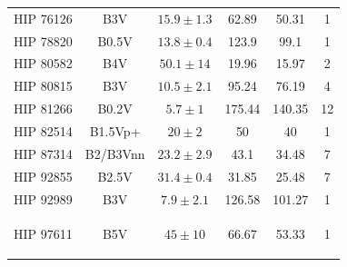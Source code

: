 \begin{small}
\begin{longtable}{|cccccc|}
        HIP 76126 & B3V &$ 15.9 \pm 1.3 $& 62.89 & 50.31 & 1 \\ 
        HIP 78820 & B0.5V & $13.8 \pm 0.4$ & 123.9 & 99.1 & 1 \\
        HIP 80582 & B4V &$ 50.1 \pm 14 $& 19.96 & 15.97 & 2 \\ 
        HIP 80815 & B3V &$ 10.5 \pm 2.1 $& 95.24 & 76.19 & 4 \\ 
        HIP 81266 & B0.2V &$ 5.7 \pm 1 $& 175.44 & 140.35 & 12 \\ 
        HIP 82514 & B1.5Vp+ &$ 20 \pm 2 $& 50 & 40 & 1 \\ 
        HIP 87314 & B2/B3Vnn &$ 23.2 \pm 2.9 $& 43.1 & 34.48 & 7 \\ 
        HIP 92855 & B2.5V &$ 31.4 \pm 0.4 $& 31.85 & 25.48 & 7 \\ 
        HIP 92989 & B3V &$ 7.9 \pm 2.1 $& 126.58 & 101.27 & 1 \\ 
        HIP 97611 & B5V &$ 45 \pm 10 $& 66.67 & 53.33 & 1        

        \label{paper1_tab:sample}
\end{longtable}
\end{small}

